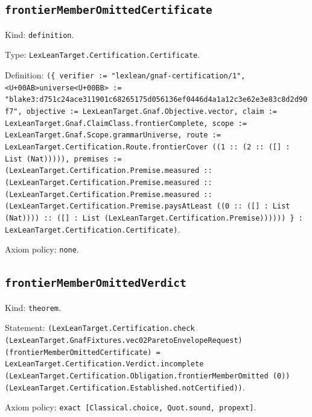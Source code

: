 \documentclass[11pt]{article}
\begin{document}
\subsection*{\texttt{frontierMemberOmittedCertificate}}
\noindent Kind: \texttt{definition}.\par
\noindent Type: \texttt{LexLeanTarget.Certification.Certificate}.\par
\noindent Definition: \texttt{(\{ verifier := "lexlean/gnaf-certification/1", <U+00AB>universe<U+00BB> := "blake3:d751c24ace311901c68265175d056136ef0446d4a1a12c3e62e3e83c8d2d90f7", objective := LexLeanTarget.Gnaf.Objective.vector, claim := LexLeanTarget.Gnaf.ClaimClass.frontierComplete, scope := LexLeanTarget.Gnaf.Scope.grammarUniverse, route := LexLeanTarget.Certification.Route.frontierCover ((1 :: (2 :: ([] : List (Nat))))), premises := (LexLeanTarget.Certification.Premise.measured :: (LexLeanTarget.Certification.Premise.measured :: (LexLeanTarget.Certification.Premise.measured :: (LexLeanTarget.Certification.Premise.paysAtLeast ((0 :: ([] : List (Nat)))) :: ([] : List (LexLeanTarget.Certification.Premise)))))) \} : LexLeanTarget.Certification.Certificate)}.\par
\noindent Axiom policy: \texttt{none}.\par
\subsection*{\texttt{frontierMemberOmittedVerdict}}
\noindent Kind: \texttt{theorem}.\par
\noindent Statement: \texttt{(LexLeanTarget.Certification.check (LexLeanTarget.GnafFixtures.vec02ParetoEnvelopeRequest) (frontierMemberOmittedCertificate) = LexLeanTarget.Certification.Verdict.incomplete (LexLeanTarget.Certification.Obligation.frontierMemberOmitted (0)) (LexLeanTarget.Certification.Established.notCertified))}.\par
\noindent Axiom policy: \texttt{exact [Classical.choice, Quot.sound, propext]}.\par
\end{document}
